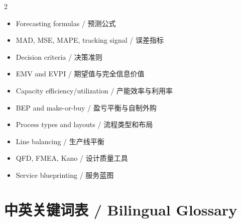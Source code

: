 \documentclass[11pt,a4paper]{ctexart}
\begin{document}
\begin{multicols}{2}
\begin{itemize}
  \item Forecasting formulas / 预测公式
  \item MAD, MSE, MAPE, tracking signal / 误差指标
  \item Decision criteria / 决策准则
  \item EMV and EVPI / 期望值与完全信息价值
  \item Capacity efficiency/utilization / 产能效率与利用率
  \item BEP and make-or-buy / 盈亏平衡与自制外购
  \item Process types and layouts / 流程类型和布局
  \item Line balancing / 生产线平衡
  \item QFD, FMEA, Kano / 设计质量工具
  \item Service blueprinting / 服务蓝图
\end{itemize}
\end{multicols}

\section{中英关键词表 / Bilingual Glossary}
\end{document}
